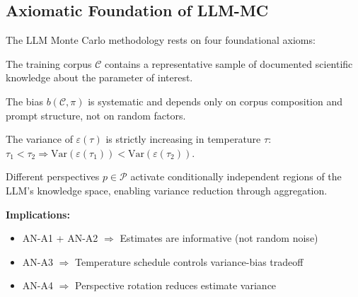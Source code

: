 
\subsection{Axiomatic Foundation of LLM-MC}
\label{sec:AN-axioms}

The LLM Monte Carlo methodology rests on four foundational axioms:

\begin{axiom}
\label{ax:AN-A1}
The training corpus $\mathcal{C}$ contains a representative sample of
documented scientific knowledge about the parameter of interest.
\end{axiom}

\begin{axiom}
\label{ax:AN-A2}
The bias $b(\mathcal{C}, \pi)$ is systematic and depends only on
corpus composition and prompt structure, not on random factors.
\end{axiom}

\begin{axiom}
\label{ax:AN-A3}
The variance of $\varepsilon(\tau)$ is strictly increasing in temperature $\tau$:
$\tau_1 < \tau_2 \Rightarrow \text{Var}(\varepsilon(\tau_1)) < \text{Var}(\varepsilon(\tau_2))$.
\end{axiom}

\begin{axiom}
\label{ax:AN-A4}
Different perspectives $p \in \mathcal{P}$ activate conditionally independent
regions of the LLM's knowledge space, enabling variance reduction through aggregation.
\end{axiom}

\textbf{Implications:}
\begin{itemize}[nosep]
    \item AN-A1 + AN-A2 $\Rightarrow$ Estimates are informative (not random noise)
    \item AN-A3 $\Rightarrow$ Temperature schedule controls variance-bias tradeoff
    \item AN-A4 $\Rightarrow$ Perspective rotation reduces estimate variance
\end{itemize}


